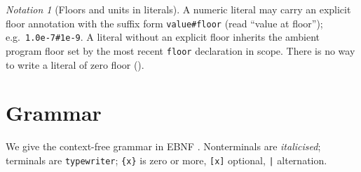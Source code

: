 \documentclass[11pt,a4paper]{article}
\theoremstyle{thmstyle}
\theoremstyle{definition}
\theoremstyle{remark}
\newtheorem{notation}[theorem]{Notation}
\newcommand{\hj}[1]{\texttt{#1}}
\begin{document}
\begin{notation}[Floors and units in literals]
\label{not:literals}
A numeric literal may carry an explicit floor annotation with the suffix
form \hj{value\#floor} (read ``value at floor''); e.g.\ \hj{1.0e-7\#1e-9}.
A literal without an explicit floor inherits the ambient program floor set
by the most recent \hj{floor} declaration in scope. There is no way to
write a literal of zero floor ().
\end{notation}

\section{Grammar}
\label{sec:grammar}

We give the context-free grammar in EBNF \citep{ebnf2017}. Nonterminals
are \textit{italicised}; terminals are \hj{typewriter}; \hj{\{x\}} is zero
or more, \hj{[x]} optional, \hj{|} alternation.
\end{document}
